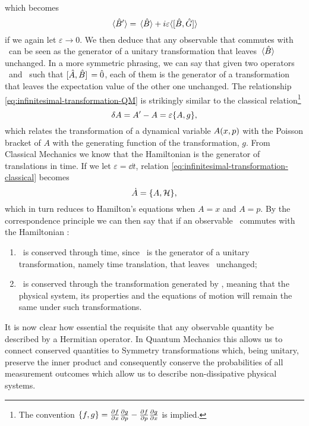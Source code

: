             which becomes
            \begin{equation}
                \label{eq:infinitesimal-transformation-QM}
                \expval*{\hB'} = \expval*{\hB} + i\varepsilon\!\expval*{\comm*{\hB}{\hG}\!}
            \end{equation}
            if we again let $\varepsilon \to 0$. We then deduce that any observable that commutes with \hB\ can be seen as the generator of a unitary transformation that leaves $\expval*{\hat{B}}$ unchanged. In a more symmetric phrasing, we can say that given two operators \hA\ and \hB\ such that $\comm*{\hA}{\hB} = \hzero$, each of them is the generator of a transformation that leaves the expectation value of the other one unchanged. The relationship \eqref{eq:infinitesimal-transformation-QM} is strikingly similar to the classical relation\footnote{The convention $\acomm{f}{g} = \pdv{f}{x}\pdv{g}{p} - \pdv{f}{p}\pdv{g}{x}$ is implied.} \cite{Goldstein2005-ep}
            \begin{equation}
                \label{eq:infinitesimal-transformation-classical}
                \var{A} = A' - A = \varepsilon\acomm{A}{g}
                \mycomma
            \end{equation}
            which relates the transformation of a dynamical variable $A\pqty{x,p}$ with the Poisson bracket of $A$ with the generating function of the transformation, $g$. From Classical Mechanics \cite{Goldstein2005-ep} we know that the Hamiltonian is the generator of translations in time. If we let $\varepsilon = \dd{t}$, relation \eqref{eq:infinitesimal-transformation-classical} becomes
            \begin{equation*}
                \dot{A} = \acomm*{A}{\mcH}\!
                \mycomma
            \end{equation*}
            which in turn reduces to Hamilton's equations when $A = x$ and $A = p$. By the correspondence principle we can then say that if an observable \hA\ commutes with the Hamiltonian \hH :
            \begin{enumerate}[label = \mybullet]
                \item \hA\ is conserved through time, since \hH\ is the generator of a unitary transformation, namely time translation, that leaves \hA\ unchanged;
                \item \hH\ is conserved through the transformation generated by \hA, meaning that the physical system, its properties and the equations of motion will remain the same under such transformations.
            \end{enumerate}
            It is now clear how essential the requisite that any observable quantity be described by a Hermitian operator. In Quantum Mechanics this allows us to connect conserved quantities to Symmetry transformations which, being unitary, preserve the inner product and consequently conserve the probabilities of all measurement outcomes which allow us to describe non-dissipative physical systems.

